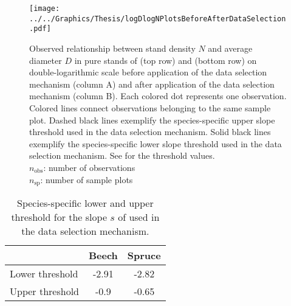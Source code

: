 \begin{figure}[h]
  \centering
  \texttt{[image: ../../Graphics/Thesis/logDlogNPlotsBeforeAfterDataSelection.pdf]}
  \caption{Observed relationship between stand density \(N\) and average diameter \(D\) in pure stands of \Beech{} (top row) and \Spruce{} (bottom row) on double-logarithmic scale before application of the data selection mechanism (column A) and after application of the data selection mechanism (column B).  Each colored dot represents one observation.  Colored lines connect observations belonging to the same sample plot.  Dashed black lines exemplify the species-specific upper slope threshold used in the data selection mechanism.  Solid black lines exemplify the species-specific lower slope threshold used in the data selection mechanism.  See  for the threshold values.  \\
    \(n_{\text{obs}}\): number of observations \\
    \(n_{\text{sp}}\): number of sample plots}
  \label{fig:logDlogNPlotsBeforeAfterDataSelection}
\end{figure}

\newpage{}  %
\begin{singlespace}
  {\tabulinesep=2mm
    \begin{longtabu}{L S S}
      \caption{Species-specific lower and upper threshold for the slope \(s\) of  used in the data selection mechanism.  \label{tab:ReinekeSlopeThresholds}} \\
      \toprule
      & {Beech} & {Spruce} \\
      \midrule
      \endhead
      \bottomrule
      \endlastfoot
      Lower threshold & -2.91 & -2.82 \\
      Upper threshold & -0.9 & -0.65 \\
    \end{longtabu}
  }
\end{singlespace}

\clearpage{}

